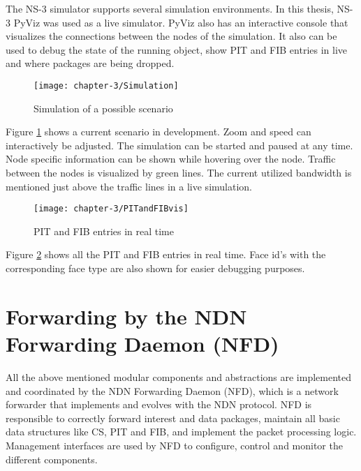 The NS-3 simulator supports several simulation environments. In this thesis, NS-3 PyViz was used as a live simulator. PyViz also has an interactive console that visualizes the connections between the nodes of the simulation. It also can be used to debug the state of the running object, show PIT and FIB entries in live and where packages are being dropped.

\begin{figure}[H]
  \centering
  \texttt{[image: chapter-3/Simulation]}
  \caption{Simulation of a possible scenario}
  \label{fig:Simulation}
\end{figure}

Figure \ref{fig:Simulation} shows a current scenario in development. Zoom and speed can interactively be adjusted. The simulation can be started and paused at any time. Node specific information can be shown while hovering over the node. Traffic between the nodes is visualized by green lines. The current utilized bandwidth is mentioned just above the traffic lines in a live simulation.

\begin{figure}[H]
  \centering
  \texttt{[image: chapter-3/PITandFIBvis]}
  \caption{PIT and FIB entries in real time}
  \label{fig:PITandFIBvis}
\end{figure}

Figure \ref{fig:PITandFIBvis} shows all the PIT and FIB entries in real time. Face id's with the corresponding face type are also shown for easier debugging purposes.

\section{Forwarding by the NDN Forwarding Daemon (NFD)}

\vspace{5mm} %

All the above mentioned modular components and abstractions are implemented and coordinated by the NDN Forwarding Daemon (NFD), which is a network forwarder that implements and evolves with the NDN protocol. NFD is responsible to correctly forward interest and data packages, maintain all basic data structures like CS, PIT and FIB, and implement the packet processing logic. Management interfaces are used by NFD to configure, control and monitor the different components.

\vspace{5mm} %


